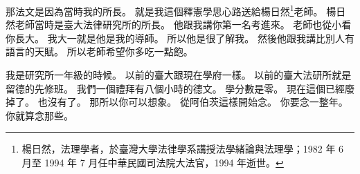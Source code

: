\hypertarget{w01:cue:4018}{}那法文是因為當時我的所長。
\hypertarget{w01:cue:4019}{}就是我這個釋憲學思心路送給楊日然\footnote{楊日然，法理學者，於臺灣大學法律學系講授法學緒論與法理學；1982 年 6 月至 1994 年 7 月任中華民國司法院大法官，1994 年逝世。}老師。
\hypertarget{w01:cue:4020}{}楊日然老師當時是臺大法律研究所的所長。
\hypertarget{w01:cue:4021}{}他跟我講你第一名考進來。
\hypertarget{w01:cue:4022}{}老師也從小看你長大。
\hypertarget{w01:cue:4023}{}我大一就是他是我的導師。
\hypertarget{w01:cue:4024}{}所以他是很了解我。
\hypertarget{w01:cue:4025}{}然後他跟我講比別人有語言的天賦。
\hypertarget{w01:cue:4026}{}所以老師希望你多吃一點飽。

\hypertarget{w01:cue:4027}{}我是研究所一年級的時候。
\hypertarget{w01:cue:4028}{}以前的臺大跟現在學府一樣。
\hypertarget{w01:cue:4029}{}以前的臺大法研所就是留德的先修班。
\hypertarget{w01:cue:4030}{}我們一個禮拜有八個小時的德文。
\hypertarget{w01:cue:4031}{}學分數是零。
\hypertarget{w01:cue:4032}{}現在這個已經廢掉了。
\hypertarget{w01:cue:4033}{}也沒有了。
\hypertarget{w01:cue:4034}{}那所以你可以想象。
\hypertarget{w01:cue:4035}{}從阿伯茨這樣開始念。
\hypertarget{w01:cue:4036}{}你要念一整年。
\hypertarget{w01:cue:4037}{}你就算念那些。

